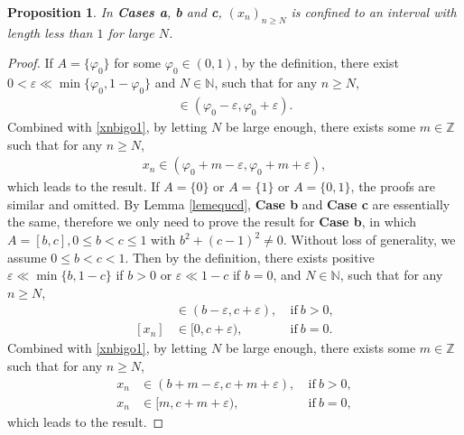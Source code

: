 \documentclass[12pt]{amsart}
\theoremstyle{plain}
\newtheorem{proposition}[theorem]{Proposition}
\newcommand{\Z}{\mathbb{Z}}
\theoremstyle{definition}
\begin{document}
\begin{proposition}\label{propconfi}
In \textbf{Cases a}, \textbf{b} and \textbf{c},  $(x_n)_{n\geq N}$
is confined to an interval with length less than $1$ for large $N$.
\end{proposition}
\begin{proof}
	If $A=\{\varphi_0\}$ for some $\varphi_0\in (0,1)$, by the definition, there exist  $0<\varepsilon\ll \min\{\varphi_0,1-\varphi_0\}$ and $N\in\mathbb{N}$, such that for any $n\geq N$,
	\begin{align}
		[x_n]\in (\varphi_0-\varepsilon,\varphi_0+\varepsilon).\nonumber
	\end{align}
Combined with \eqref{xnbigo1}, by letting $N$ be large enough, there exists some $m\in\Z$ such that for any $n\geq N$,
\begin{align}
	x_n\in (\varphi_0+m-\varepsilon,\varphi_0+m+\varepsilon),\nonumber
\end{align}
which leads to the result. If $A=\{0\}$ or $A=\{1\}$ or $A=\{0,1\}$, the proofs are similar and omitted.
By Lemma \ref{lemequcd},  \textbf{Case b} and \textbf{Case c} are essentially the same, therefore we only need to prove the result for \textbf{Case b}, in which $A=[b,c],0\leq b<c\leq 1$ with $b^2+(c-1)^2\neq 0$. Without loss of generality, we assume $0\leq b<c<1$. Then by the definition, there exists positive $\varepsilon\ll \min \{b,1-c\}$ if $b>0$ or $\varepsilon\ll 1-c$ if $b=0$, and $N\in\mathbb{N}$, such that for any $n\geq N$,
\begin{align}
	[x_n]&\in (b-\varepsilon,c+\varepsilon),\ &\mathrm{if}\ b>0,\nonumber\\
	[x_n]&\in [0,c+\varepsilon),\ &\mathrm{if}\ b=0\nonumber.
\end{align}
Combined with \eqref{xnbigo1}, by letting $N$ be large enough, there exists some $m\in\Z$ such that for any $n\geq N$,
\begin{align}
	x_n&\in (b+m-\varepsilon,c+m+\varepsilon),\ &\mathrm{if}\ b>0,\nonumber\\
	x_n&\in [m,c+m+\varepsilon),\ &\mathrm{if}\ b=0,\nonumber
\end{align}
which leads to the result.
\end{proof}
\end{document}
